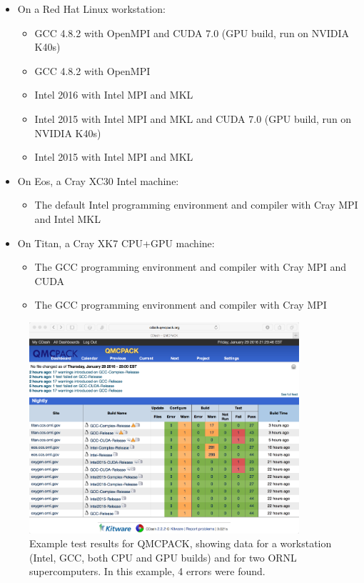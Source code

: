 \begin{itemize}
\item On a Red Hat Linux workstation:
  \begin{itemize}
  \item GCC 4.8.2 with OpenMPI and CUDA 7.0 (GPU build, run on NVIDIA K40s) 
  \item GCC 4.8.2 with OpenMPI 
  \item Intel 2016 with Intel MPI and MKL
  \item Intel 2015 with Intel MPI and MKL and CUDA 7.0 (GPU build, run on NVIDIA K40s) 
  \item Intel 2015 with Intel MPI  and MKL
  \end{itemize}
\item On Eos, a Cray XC30 Intel machine:
  \begin{itemize}
\item The default Intel programming environment and compiler with Cray MPI and Intel MKL
  \end{itemize}

\item On Titan, a Cray XK7 CPU+GPU machine:
  \begin{itemize}
  \item The GCC programming environment and compiler with Cray MPI and CUDA 
  \item The GCC programming environment and compiler with Cray MPI 
  \end{itemize}
\end{itemize}

\begin{figure}
  \centering
  \includegraphics[width=10cm]{figures/QMCPACK_CDash_Ctest_Results_20160129.png}
  \caption{Example test results for QMCPACK, showing data for a
    workstation (Intel, GCC, both CPU and GPU builds) and for two ORNL
    supercomputers. In this example, 4 errors were found.}
  \label{fig:cdash}
\end{figure}

